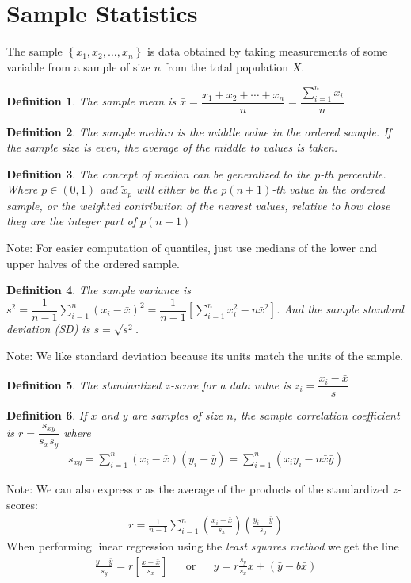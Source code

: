\documentclass[10pt]{article}
\newtheorem*{definition}{Definition}
\theoremstyle{definition}
\newcommand{\ds}{\displaystyle}
\begin{document}
\section*{Sample Statistics}
The sample \(\left\{x_1, x_2, \ldots, x_n\right\}\) is data obtained by taking measurements of some variable from a sample of size \(n\) from the total population \(X\).

\begin{definition}
	The \emph{sample mean} is \(\bar{x}= \dfrac{x_1+x_2+\cdots+x_n}{n}=\dfrac{\sum_{i=1}^{n}x_i}{n}\)
\end{definition}

\begin{definition}
	The \emph{sample median} is the middle value in the ordered sample. If the sample size is even, the average of the middle to values is taken.
\end{definition}

\begin{definition}
	The concept of median can be generalized to the \emph{\(p\)-th percentile}. Where \(p\in (0,1)\) and \(\tilde{x}_p\) will either be the \(p(n+1)\)-th value in the ordered sample, or the weighted contribution of the nearest values, relative to how close they are the integer part of \(p(n+1)\)
\end{definition}

Note: For easier computation of quantiles, just use medians of the lower and upper halves of the ordered sample.

\begin{definition}
	The \emph{sample variance} is \(s^2=\dfrac{1}{n-1}\ds\sum_{i=1}^{n}(x_i - \bar{x})^2 = \dfrac{1}{n-1}\left[\sum_{i=1}^{n}x_i^2 - n\bar{x}^2\right]\). And the \emph{sample standard deviation (SD)} is \(s=\sqrt{s^2}\).
\end{definition}

Note: We like standard deviation because its units match the units of the sample.

\begin{definition}
	The \emph{standardized \(z\)-score} for a data value is \(z_i = \dfrac{x_i - \bar{x}}{s}\)
\end{definition}

\begin{definition}
	If \(x\) and \(y\) are samples of size \(n\), the \emph{sample correlation coefficient} is \(r=\dfrac{s_{xy}}{s_x s_y}\) where
	\begin{align*}
		s_{xy} = \sum_{i=1}^{n}(x_i - \bar{x})(y_i - \bar{y}) = \sum_{i=1}^{n}(x_i y_i - n\bar{x}\bar{y})
	\end{align*}
\end{definition}
Note: We can also express \(r\) as the average of the products of the standardized \(z\)-scores:
\begin{align*}
	r = \frac{1}{n-1} \sum_{i=1}^{n} \left( \frac{x_i-\bar{x}}{s_x} \right) \left( \frac{y_i-\bar{y}}{s_y} \right)
\end{align*}
When performing linear regression using the \emph{least squares method} we get the line
\begin{align*}
	\frac{y-\bar{y}}{s_y} = r \left[\frac{x-\bar{x}}{s_x}\right] && \text{or} && y = r\frac{s_y}{s_x}x + (\bar{y}-b\bar{x})
\end{align*}
\end{document}

